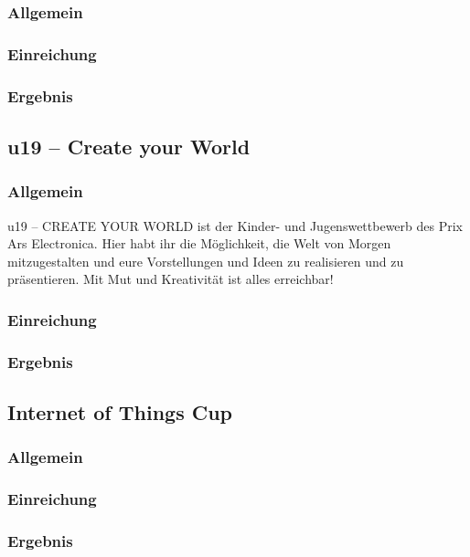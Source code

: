 \subsubsection{Allgemein}

\subsubsection{Einreichung}

\subsubsection{Ergebnis}


\subsection{u19 -- Create your World}
\subsubsection{Allgemein}
u19 – CREATE YOUR WORLD ist der Kinder- und Jugenswettbewerb des Prix Ars Electronica.
Hier habt ihr die Möglichkeit, die Welt von Morgen mitzugestalten und eure Vorstellungen
und Ideen zu realisieren und zu präsentieren. Mit Mut und Kreativität ist alles erreichbar!

\subsubsection{Einreichung}

\subsubsection{Ergebnis}


\subsection{Internet of Things Cup}
\subsubsection{Allgemein}

\subsubsection{Einreichung}

\subsubsection{Ergebnis}
